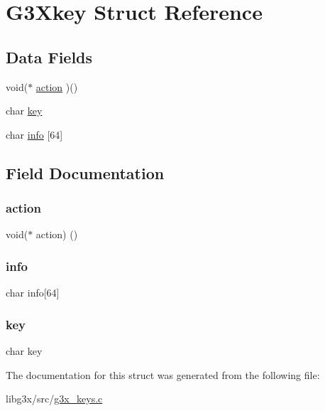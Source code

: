 \hypertarget{struct_g3_xkey}{}\section{G3\+Xkey Struct Reference}
\label{struct_g3_xkey}
\subsection*{Data Fields}
\begin{DoxyCompactItemize}
\item 
void($\ast$ \hyperlink{struct_g3_xkey_ab9b939162161b10361618af747095d06}{action} )()
\item 
char \hyperlink{struct_g3_xkey_acad36f7a1211e9e9da68e181667d9c3f}{key}
\item 
char \hyperlink{struct_g3_xkey_a27acbfc0545ba6b07ee04d1be61713c8}{info} \mbox{[}64\mbox{]}
\end{DoxyCompactItemize}


\subsection{Field Documentation}
\mbox{\label{struct_g3_xkey_ab9b939162161b10361618af747095d06}} 
\subsubsection{\texorpdfstring{action}{action}}
{\footnotesize\ttfamily void($\ast$ action) ()}

\mbox{\label{struct_g3_xkey_a27acbfc0545ba6b07ee04d1be61713c8}} 
\subsubsection{\texorpdfstring{info}{info}}
{\footnotesize\ttfamily char info\mbox{[}64\mbox{]}}

\mbox{\label{struct_g3_xkey_acad36f7a1211e9e9da68e181667d9c3f}} 
\subsubsection{\texorpdfstring{key}{key}}
{\footnotesize\ttfamily char key}



The documentation for this struct was generated from the following file\+:\begin{DoxyCompactItemize}
\item 
libg3x/src/\hyperlink{g3x__keys_8c}{g3x\+\_\+keys.\+c}\end{DoxyCompactItemize}
